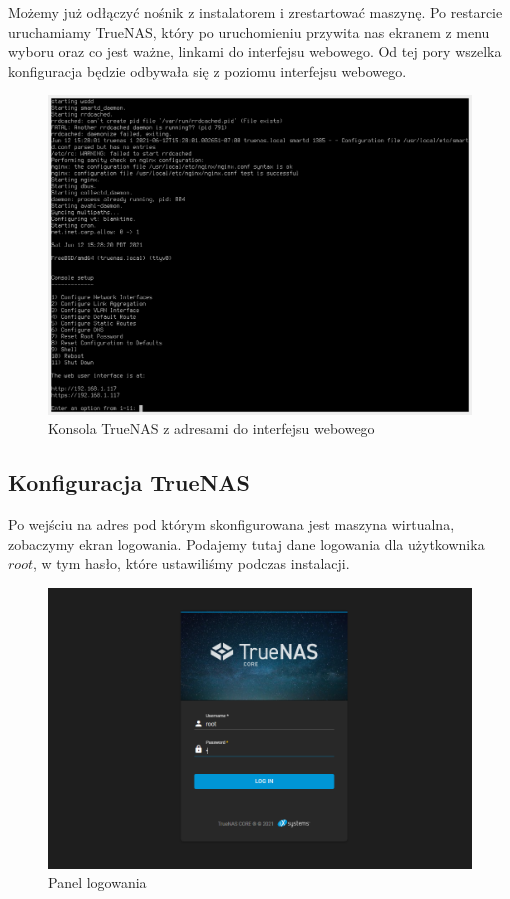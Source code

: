 \documentclass[12pt,a4paper]{article}
\newcommand{\<}{\langle}
\renewcommand{\>}{\rangle}
\theoremstyle{definition}
\begin{document}
Możemy już odłączyć nośnik z instalatorem i zrestartować maszynę. Po restarcie uruchamiamy TrueNAS, który po uruchomieniu przywita nas ekranem z menu wyboru oraz co jest ważne, linkami do interfejsu webowego. Od tej pory wszelka konfiguracja będzie odbywała się z poziomu interfejsu webowego.

\begin{figure}[H]
    \centering
    \includegraphics[width=\linewidth]{img/ss_truenas/14.png}
    \caption{Konsola TrueNAS z adresami do interfejsu webowego}
    \label{vm_cli}
\end{figure}

\newpage
\subsection{Konfiguracja TrueNAS}

Po wejściu na adres pod którym skonfigurowana jest maszyna wirtualna, zobaczymy ekran logowania. Podajemy tutaj dane logowania dla użytkownika $root$, w tym hasło, które ustawiliśmy podczas instalacji.

\begin{figure}[H]
    \centering
    \includegraphics[width=\linewidth]{img/ss_truenas/16.png}
    \caption{Panel logowania}
    \label{login_screen}
\end{figure}
\end{document}
